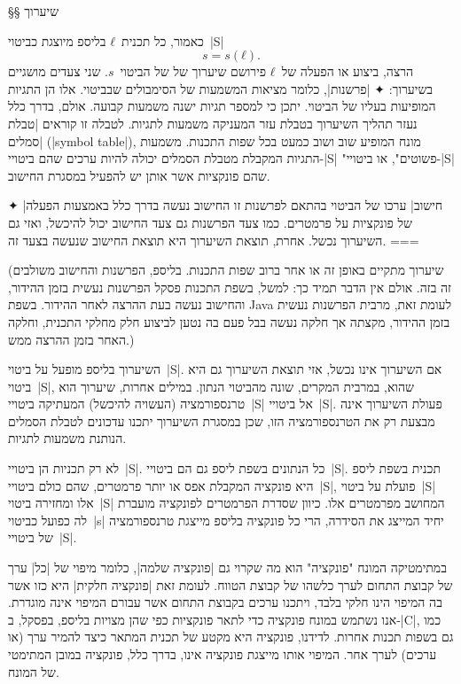 §§ שיערוך

כאמור, כל תכנית~$ℓ$ בליספ מיוצגת כביטוי~\E|S| \[
  s=s(ℓ).
\] הרצה, ביצוע או הפעלה של~$ℓ$ פירושם שיערוך של של הביטוי~$s$. שני צעדים
מושגיים בשיערוך:
✦ \ע|פרשנות|, כלומר מציאות המשמעות של הסימבולים שבביטוי. אלו הן התגיות המופיעות
בעליו של הביטוי. יתכן כי למספר תגיות ישנה משמעות קבועה. אולם, בדרך כלל נעזר
תהליך השיערוך בטבלת עזר המעניקה משמעות לתגיות. לטבלה זו קוראים \ע|טבלת סמלים|
(\E|symbol table|), מונח המופיע שוב ושוב כמעט בכל שפות התכנות. משמעות התגיות
המקבלת מטבלת הסמלים יכולה להיות ערכים שהם ביטויי-\E|S| "פשוטים", או
ביטויי-\E|S| שהם פונקציות אשר אותן יש להפעיל במסגרת החישוב.

✦ \ע|חישוב| ערכו של הביטוי בהתאם לפרשנות זו החישוב נעשה בדרך כלל באמצעות הפעלה
של פונקציות על פרמטרים. כמו צעד הפרשנות גם צעד החישוב יכול להיכשל, ואזי גם
השיערוך נכשל. אחרת, תוצאת השיערוך היא תוצאת החישוב שנעשה בצעד זה.
===

(שיערוך מתקיים באופן זה או אחר ברוב שפות התכנות. בליספ, הפרשנות והחישוב
משולבים זה בזה. אולם אין הדבר תמיד כך: למשל, בשפת התכנות פסקל הפרשנות נעשית
בזמן ההידור, והחישוב נעשה בעת ההרצה לאחר ההידור. בשפת Java לעומת זאת, מרבית
הפרשנות נעשית בזמן ההידור, מקצתה אך חלקה נעשה בבל פעם בה נטען לביצוע חלק מחלקי
התכנית, וחלקה האחר בזמן ההרצה ממש.)

השיערוך בליספ מופעל על ביטוי~\E|S|. אם השיערוך אינו נכשל, אזי תוצאת השיערוך גם
היא ביטוי~\E|S|, שהוא, במרבית המקרים, שונה מהביטוי הנתון. במילים אחרות, שיערוך
הוא טרנספורמציה (העשויה להיכשל) המעתיקה ביטויי~\E|S| אל ביטויי~\E|S|. פעולת
השיערוך אינה מבצעת רק את הטרנספורמציה הזו, שכן במסגרת השיערוך יתכנו עדכונים
לטבלת הסמלים הנותנת משמעות לתגיות.

לא רק תכניות הן ביטויי~\E|S|. כל הנתונים בשפת ליספ גם הם ביטויי~\E|S|. תכנית
בשפת ליספ היא פונקציה המקבלת אפס או יותר פרמטרים, שהם כולם ביטויי~\E|S|, פועלת
על ביטוי~\E|S| אלו ומחזירה ביטוי~\E|S| המחושב מפרמטרים אלו. כיוון שסדרת
הפרמטרים לפונקציה מועברת לה כפועל כביטוי~\E|s| יחיד המייצג את הסידרה, הרי כל
פונקציה בליספ מייצגת טרנספורמציה של ביטויי~\E|S|.

במתימטיקה המונח "פונקציה" הוא מה שקרוי גם \ע|פונקציה שלמה|, כלומר מיפוי של
\ע|כל| ערך של קבוצת התחום לערך כלשהו של קבוצת הטווח. לעומת זאת \ע|פונקציה
חלקית| היא כזו אשר בה המיפוי הינו חלקי בלבד, ויתכנו ערכים בקבוצת התחום אשר
עבורם המיפוי אינה מוגדרת. אנו נשתמש במונח פונקציה כדי לתאר פונקציות כפי שהן
מצויות בליספ, בפסקל, ב-\E|C|, כמו גם בשפות תכנות אחרות. לדידנו, פונקציה היא
מקטע של תכנית המתאר כיצד להמיר ערך (או ערכים) לערך אחר. המיפוי אותו מייצגת
פונקציה אינו, בדרך כלל, פונקציה במובן המתימטי של המונח.

